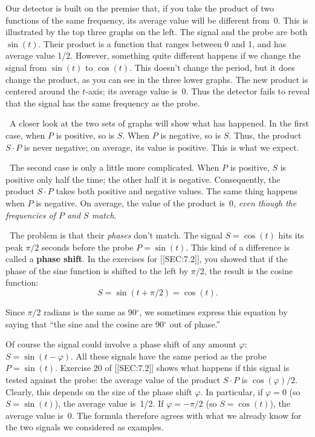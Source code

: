 {{{{\noindent
{}

\vspace{220pt}

Our detector is built on the premise that, if you take the product of two functions of the same frequency, its average value will be different from~0.  This is illustrated by the top three graphs on the left.  The signal and the probe are both $\sin(t)$.  Their product is a function that ranges between 0 and 1, and has average value 1/2.  However, something quite different happens if we change the signal from $\sin(t)$ to $\cos(t)$.  This doesn't change the period, but it does change the product, as you can see in the three lower graphs.  The new product is centered around the $t$-axis; its average value is~0.  Thus the detector fails to reveal that the signal has the same frequency as the probe.   
		  
\quad \	A closer look at the two sets of graphs will show what has happened.  In the first case, when $P$ is positive, so is $S$.  When $P$ is negative, so is $S$.  Thus, the product $S \cdot P$ is never negative; on average, its value is positive.  This is what we expect.

\quad \ The second case is only a little more complicated.  When $P$ is positive, $S$ is positive only half the time; the other half it is negative.  Consequently, the product $S \cdot P$ takes both positive and negative values.  The same thing happens when $P$ is negative.  On average, the value of the product is~0, {\em even though the frequencies of $P$ and $S$ match}.  
	
\quad \ The problem is that their {\em phases\/} don't match.  The signal $S = \cos(t)$ hits its peak $\pi/2$ seconds before the probe $P = \sin(t)$.  This kind of a difference is called a {\bf phase shift}.  In the exercises for [[SEC:7.2]], you showed that if the phase of the sine function is shifted to the left by $\pi/2$, the result is the cosine function:
\vspace{-8pt}
	\[
S = \sin(t + \pi/2) = \cos(t).
\]
\medskip

\noindent
Since $\pi/2$ radians is the same as 90$^\circ$, we sometimes express this equation by saying that ``the sine and the cosine are 90$^\circ$ out of phase.''	
	
	Of course the signal could involve a phase shift 
of any amount $\varphi$: $S = \sin(t - \varphi)$.  All these signals have the same period as the probe $P = \sin(t)$.  Exercise 20 of [[SEC:7.2]] shows what happens if this signal is tested against the probe: the average value of the product $S \cdot P$ is $\cos(\varphi)/2$.  Clearly, this depends on the size of the phase shift $\varphi$.  In particular, if  
$\varphi = 0$ (so $S = \sin(t)$), the average value is~1/2.  If $\varphi = -\pi/2$ (so $S = \cos(t)$), the average value is~0.  The formula therefore agrees with what we already know for the two signals we considered as examples.  

}}}}
